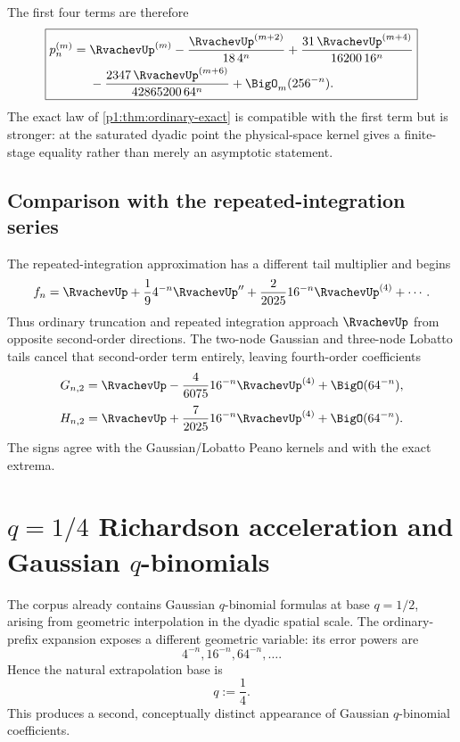 \documentclass[11pt]{article}
\numberwithin{equation}{section}
\theoremstyle{definition}
\theoremstyle{remark}
\begin{document}
The first four terms are therefore
\begin{equation}
 \boxed{
 \begin{aligned}
 p_n^{(m)}={}&\RvachevUp^{(m)}
 -\frac{\RvachevUp^{(m+2)}}{18\,4^n}
 +\frac{31\,\RvachevUp^{(m+4)}}{16200\,16^n}\\
 &-\frac{2347\,\RvachevUp^{(m+6)}}{42865200\,64^n}
 +\BigO_m(256^{-n}).
 \end{aligned}}
 \label{p1:eq:prefix-first-terms}
\end{equation}
The exact law of \cref{p1:thm:ordinary-exact} is compatible with the first term but is stronger: at the saturated dyadic point the physical-space kernel gives a finite-stage equality rather than merely an asymptotic statement.

\subsection{Comparison with the repeated-integration series}

The repeated-integration approximation has a different tail multiplier and begins
\[
 f_n=\RvachevUp+\frac1{9}4^{-n}\RvachevUp''+\frac{2}{2025}16^{-n}\RvachevUp^{(4)}+\cdots.
\]
Thus ordinary truncation and repeated integration approach $\RvachevUp$ from opposite second-order directions.  The two-node Gaussian and three-node Lobatto tails cancel that second-order term entirely, leaving fourth-order coefficients
\begin{equation}
 G_{n,2}=\RvachevUp-\frac4{6075}16^{-n}\RvachevUp^{(4)}+\BigO(64^{-n}),
 \label{p1:eq:G2-leading}
\end{equation}
\begin{equation}
 H_{n,2}=\RvachevUp+\frac7{2025}16^{-n}\RvachevUp^{(4)}+\BigO(64^{-n}).
 \label{p1:eq:H2-leading}
\end{equation}
The signs agree with the Gaussian/Lobatto Peano kernels and with the exact extrema.

\section{$q=1/4$ Richardson acceleration and Gaussian $q$-binomials}
\label{p1:sec:q-richardson}

The corpus already contains Gaussian $q$-binomial formulas at base $q=1/2$, arising from geometric interpolation in the dyadic spatial scale.  The ordinary-prefix expansion exposes a different geometric variable: its error powers are
\[
 4^{-n},16^{-n},64^{-n},\ldots.
\]
Hence the natural extrapolation base is
\begin{equation}
 q:=\frac14.
 \label{p1:eq:q-quarter}
\end{equation}
This produces a second, conceptually distinct appearance of Gaussian $q$-binomial coefficients.
\end{document}
